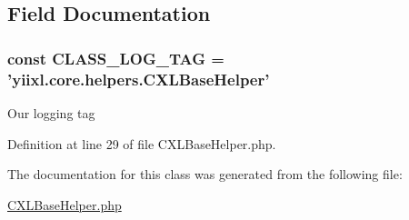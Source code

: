 \begin{DoxyCode}
  {
  }
\end{DoxyCode}




\subsection{Field Documentation}
\hypertarget{classCXLBaseHelper_aa607ab5e557e6ebb60b85c5a20ad067f}{
\subsubsection[{CLASS\_\-LOG\_\-TAG}]{\setlength{\rightskip}{0pt plus 5cm}const {\bf CLASS\_\-LOG\_\-TAG} = 'yiixl.core.helpers.CXLBaseHelper'}}
\label{classCXLBaseHelper_aa607ab5e557e6ebb60b85c5a20ad067f}
Our logging tag 

Definition at line 29 of file CXLBaseHelper.php.



The documentation for this class was generated from the following file:\begin{DoxyCompactItemize}
\item 
\hyperlink{CXLBaseHelper_8php}{CXLBaseHelper.php}\end{DoxyCompactItemize}
